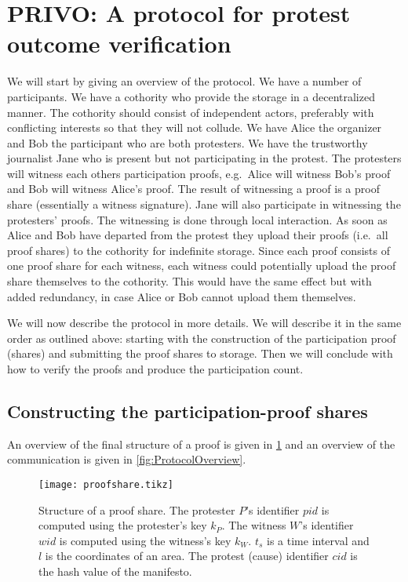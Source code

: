 \section{PRIVO: A protocol for protest outcome verification}
\label{protocol}

We will start by giving an overview of the protocol.
We have a number of participants.
We have a cothority who provide the storage in a decentralized manner.
The cothority should consist of independent actors, preferably with conflicting 
interests so that they will not collude.
We have Alice the organizer and Bob the participant who are both protesters.
We have the trustworthy journalist Jane who is present but not participating in 
the protest.
The protesters will witness each others participation proofs, e.g.\ Alice will 
witness Bob's proof and Bob will witness Alice's proof.
The result of witnessing a proof is a proof share (essentially a witness 
signature).
Jane will also participate in witnessing the protesters' proofs.
The witnessing is done through local interaction.
As soon as Alice and Bob have departed from the protest they upload their proofs 
(i.e.\ all proof shares) to the cothority for indefinite storage.
Since each proof consists of one proof share for each witness, each witness 
could potentially upload the proof share themselves to the cothority.
This would have the same effect but with added redundancy, in case Alice or Bob 
cannot upload them themselves.

We will now describe the protocol in more details.
We will describe it in the same order as outlined above:
starting with the construction of the participation proof (shares) and 
submitting the proof shares to storage.
Then we will conclude with how to verify the proofs and produce the 
participation count.

\subsection{Constructing the participation-proof shares}

An overview of the final structure of a proof is given in \cref{fig:ProofFig} 
and an overview of the communication is given in \cref{fig:ProtocolOverview}.

\begin{figure}
  \centering
  \texttt{[image: proofshare.tikz]}
  \caption{%
    Structure of a proof share.
    The protester \(P\)'s identifier \(pid\) is computed using the protester's 
    key \(k_P\).
    The witness \(W\)'s identifier \(wid\) is computed using the witness's key 
    \(k_W\).
    \(t_s\) is a time interval and \(l\) is the coordinates of an area.
    The protest (cause) identifier \(cid\) is the hash value of the manifesto.
  }%
  \label{fig:ProofFig}
\end{figure}%

